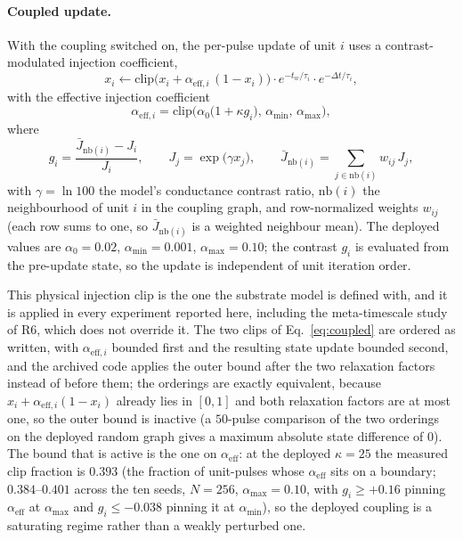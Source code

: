 \documentclass[preprint,12pt]{elsarticle}
\begin{document}
\paragraph{Coupled update.} With the coupling switched on, the per-pulse
update of unit $i$ uses a contrast-modulated injection coefficient,
\begin{equation}
\label{eq:coupled}
x_i \leftarrow \mathrm{clip}\Big(x_i+\alpha_{\mathrm{eff},i}\,(1-x_i)\Big)
\cdot e^{-t_w/\tau_i}\cdot e^{-\Delta t/\tau_i},
\end{equation}
with the effective injection coefficient
\begin{equation}
\label{eq:coeff}
\alpha_{\mathrm{eff},i}=\mathrm{clip}\Big(\alpha_0\big(1+\kappa g_i\big),\,
\alpha_{\min},\,\alpha_{\max}\Big),
\end{equation}
where
\begin{equation}
\label{eq:contrast}
g_i=\frac{\bar J_{\mathrm{nb}(i)}-J_i}{J_i},
\qquad
J_j=\exp\!\big(\gamma x_j\big),\qquad
\bar J_{\mathrm{nb}(i)}=\sum_{j\in\mathrm{nb}(i)}w_{ij}\,J_j ,
\end{equation}
with $\gamma=\ln 100$ the model's conductance contrast ratio,
$\mathrm{nb}(i)$ the neighbourhood of unit $i$ in the coupling graph, and
row-normalized weights $w_{ij}$ (each row sums to one, so
$\bar J_{\mathrm{nb}(i)}$ is a weighted neighbour mean). The deployed
values are $\alpha_0=0.02$, $\alpha_{\min}=0.001$, $\alpha_{\max}=0.10$; the
contrast $g_i$ is evaluated from the pre-update state, so the update is
independent of unit iteration order.

This physical injection clip is the one
the substrate model is defined with, and it is applied in every experiment
reported here, including the meta-timescale study of R6, which does not
override it. The two clips of Eq.~\eqref{eq:coupled} are ordered as written,
with $\alpha_{\mathrm{eff},i}$ bounded first and the resulting state update
bounded second, and the archived code applies the outer bound after the two
relaxation factors instead of before them; the orderings are exactly
equivalent, because $x_i+\alpha_{\mathrm{eff},i}(1-x_i)$ already lies in
$[0,1]$ and both relaxation factors are at most one, so the outer bound is
inactive (a $50$-pulse comparison of the two orderings on the deployed random
graph gives a maximum absolute state difference of $0$). The bound that is
active is the one on $\alpha_{\mathrm{eff}}$: at the deployed $\kappa=25$ the
measured clip fraction is $0.393$ (the fraction of unit-pulses whose
$\alpha_{\mathrm{eff}}$ sits on a boundary; $0.384$--$0.401$ across the ten
seeds, $N=256$, $\alpha_{\max}=0.10$, with $g_i\geq+0.16$ pinning
$\alpha_{\mathrm{eff}}$ at $\alpha_{\max}$ and $g_i\leq-0.038$ pinning it at
$\alpha_{\min}$), so the deployed coupling is a saturating regime rather than a
weakly perturbed one.
\end{document}
